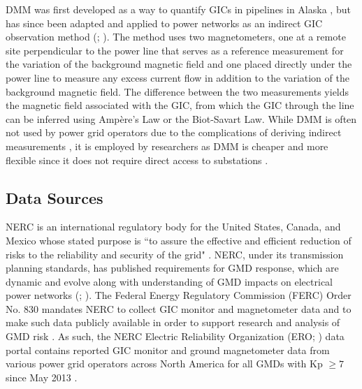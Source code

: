 \documentclass[draft]{agujournal2019}
\begin{document}
DMM was first developed as a way to quantify GICs in pipelines in Alaska \cite{Campbell1980}, but has since been adapted and applied to power networks as an indirect GIC observation method (; ). The method uses two magnetometers, one at a remote site perpendicular to the power line that serves as a reference measurement for the variation of the background magnetic field and one placed directly under the power line to measure any excess current flow in addition to the variation of the background magnetic field. The difference between the two measurements yields the magnetic field associated with the GIC, from which the GIC through the line can be inferred using Ampère's Law or the Biot-Savart Law. While DMM is often not used by power grid operators due to the complications of deriving indirect measurements \cite{Marsal2021}, it is employed by researchers as DMM is cheaper and more flexible since it does not require direct access to substations \cite{Parry2024}.

\subsection{Data Sources}

NERC is an international regulatory body for the United States, Canada, and Mexico whose stated purpose is ``to assure the effective and efficient reduction of risks to the reliability and security of the grid" \cite{NERC2026_mission}.
NERC, under its transmission planning standards, has published requirements for GMD response, which are dynamic and evolve along with understanding of GMD impacts on electrical power networks (; ).
The Federal Energy Regulatory Commission (FERC) Order No. 830 mandates NERC to collect GIC monitor and magnetometer data and to make such data publicly available in order to support research and analysis of GMD risk \cite{FERC2016}. As such, the NERC Electric Reliability Organization (ERO; ) data portal contains reported GIC monitor and ground magnetometer data from various power grid operators across North America for all GMDs with Kp $\geq7$ since May 2013 \cite{NERC2026_reporting}.
\end{document}
